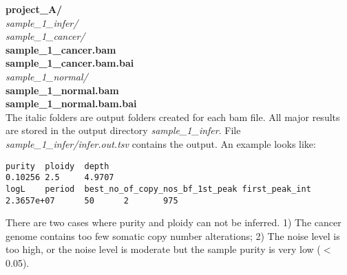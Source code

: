 \documentclass{article}
\begin{document}
\indent \textbf{project\_A/} \\
\indent \indent \textit{sample\_1\_infer/} \\
\indent \indent \textit{sample\_1\_cancer/} \\
\indent \indent \textbf{sample\_1\_cancer.bam} \\
\indent \indent \textbf{sample\_1\_cancer.bam.bai} \\
\indent \indent \textit{sample\_1\_normal/} \\
\indent \indent \textbf{sample\_1\_normal.bam} \\
\indent \indent \textbf{sample\_1\_normal.bam.bai} \\

The italic folders are output folders created for each bam file. All major results are stored in the output directory \textit{sample\_1\_infer}. File \textit{sample\_1\_infer/infer.out.tsv} contains the output. An example looks like: \\

\begin{verbatim}
purity  ploidy  depth
0.10256 2.5     4.9707
logL    period  best_no_of_copy_nos_bf_1st_peak first_peak_int
2.3657e+07      50      2       975
\end{verbatim}


There are two cases where purity and ploidy can not be inferred. 1) The cancer genome contains too few somatic copy number alterations; 2) The noise level is too high, or the noise level is moderate but the sample purity is very low ($<$0.05).
\end{document}

